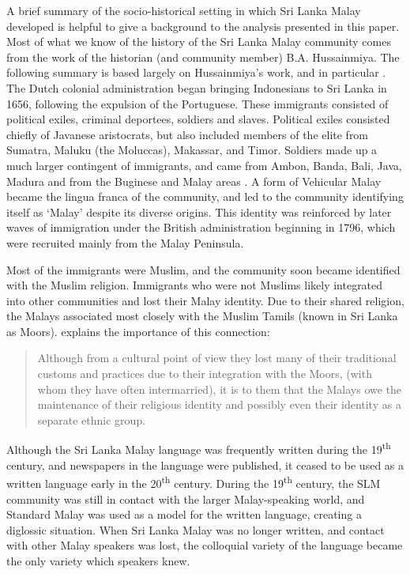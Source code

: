 A brief summary of the socio-historical setting in which Sri Lanka Malay developed is helpful to give a background to the analysis presented in this paper. Most of what we know of the history of the Sri Lanka Malay community comes from the work of the historian (and community member) B.A. Hussainmiya. The following summary is based largely on Hussainmiya's work, and in particular \citet{Hussainmiya1987,Hussainmiya2008}. The Dutch colonial administration began bringing Indonesians to Sri Lanka in 1656, following the expulsion of the Portuguese. These immigrants consisted of political exiles, criminal deportees, soldiers and slaves. Political exiles consisted chiefly of Javanese aristocrats, but also included members of the elite from Sumatra, Maluku (the Moluccas), Makassar, and Timor. Soldiers made up a much larger contingent of immigrants, and came from Ambon, Banda, Bali, Java, Madura and from the Buginese and Malay areas \citep[24]{Adelaar1991}. A form of Vehicular Malay became the lingua franca of the community, and led to the community identifying itself as `Malay' despite its diverse origins. This identity was reinforced by later waves of immigration under the British administration beginning in 1796, which were recruited mainly from the Malay Peninsula.

Most of the immigrants were Muslim, and the community soon became identified with the Muslim religion. Immigrants who were not Muslims likely integrated into other communities and lost their Malay identity. Due to their shared religion, the Malays associated most closely with the Muslim Tamils (known in Sri Lanka as Moors). \citet[24]{Adelaar1991} explains the importance of this connection: 

\begin{quote}
Although from a cultural point of view they lost many of their traditional customs and practices due to their integration with the Moors, (with whom they have often intermarried), it is to them that the Malays owe the maintenance of their religious identity and possibly even their identity as a separate ethnic group.
\end{quote}

Although the Sri Lanka Malay language was frequently written during the 19\textsuperscript{th} century, and newspapers in the language were published, it ceased to be used as a written language early in the 20\textsuperscript{th} century. During the 19\textsuperscript{th} century, the SLM community was still in contact with the larger Malay-speaking world, and Standard Malay was used as a model for the written language, creating a diglossic situation. When Sri Lanka Malay was no longer written, and contact with other Malay speakers was lost, the colloquial variety of the language became the only variety which speakers knew.

